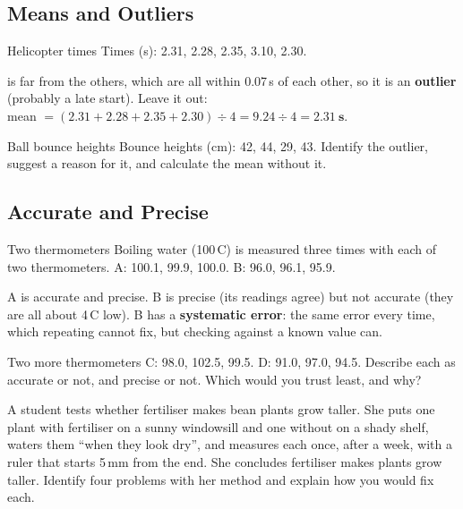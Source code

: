 \subsection{Means and Outliers}\label{sub:a2.1}

\begin{workedex}{Helicopter times}
Times (s): 2.31, 2.28, 2.35, 3.10, 2.30.

 is far from the others, which are all within 0.07\,s of each other, so it is an \textbf{outlier} (probably a late start). Leave it out:\\
mean $= (2.31 + 2.28 + 2.35 + 2.30) \div 4 = 9.24 \div 4 = \mathbf{2.31\ s}$.
\end{workedex}

\begin{wedo}{Ball bounce heights}
Bounce heights (cm): 42, 44, 29, 43. Identify the outlier, suggest a reason for it, and calculate the mean without it.
\workbox{4.5cm}
\end{wedo}

\subsection{Accurate and Precise}\label{sub:a2.2}

\begin{workedex}{Two thermometers}
Boiling water (100\,\textdegree C) is measured three times with each of two thermometers.
A: 100.1, 99.9, 100.0. \quad B: 96.0, 96.1, 95.9.

\smallskip
A is accurate and precise. B is precise (its readings agree) but not accurate (they are all about 4\,\textdegree C low). B has a \textbf{systematic error}: the same error every time, which repeating cannot fix, but checking against a known value can.
\end{workedex}

\begin{wedo}{Two more thermometers}
C: 98.0, 102.5, 99.5. \quad D: 91.0, 97.0, 94.5. Describe each as accurate or not, and precise or not. Which would you trust least, and why?
\answerbox{4.5cm}
\end{wedo}

\label{prac:2}


\label{ext:2}

\task A student tests whether fertiliser makes bean plants grow taller. She puts one plant with fertiliser on a sunny windowsill and one without on a shady shelf, waters them ``when they look dry'', and measures each once, after a week, with a ruler that starts 5\,mm from the end. She concludes fertiliser makes plants grow taller. Identify four problems with her method and explain how you would fix each.
\answerbox{9cm}

